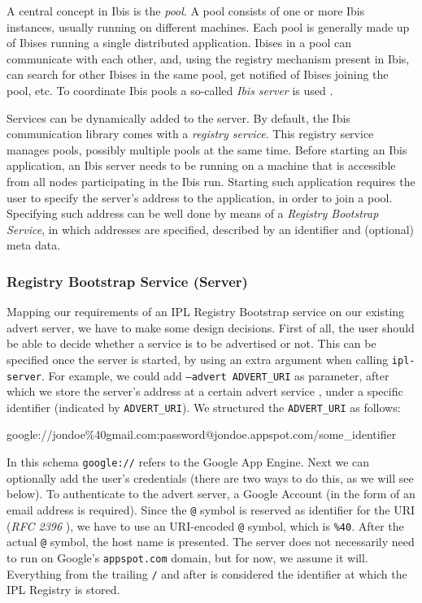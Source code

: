 A central concept in Ibis is the \emph{pool}. A pool consists of one or more Ibis
instances, usually running on different machines. Each pool is generally made up
of Ibises running a single distributed application. Ibises in a pool can
communicate with each other, and, using the registry mechanism present in Ibis,
can search for other Ibises in the same pool, get notified of Ibises joining the
pool, etc. To coordinate Ibis pools a so-called \emph{Ibis server} is used
\cite{ipl-usersguide}.

Services can be dynamically added to the server. By default, the Ibis
communication library comes with a \emph{registry service}. This registry
service manages pools, possibly multiple pools at the same time. Before starting
an Ibis application, an Ibis server needs to be running on a machine that is
accessible from all nodes participating in the Ibis run. Starting such
application requires the user to specify the server's address to the
application, in order to join a pool. Specifying such address can be well done
by means of a \emph{Registry Bootstrap Service}, in which addresses are
specified, described by an identifier and (optional) meta data.

\subsubsection{Registry Bootstrap Service (Server)}
Mapping our requirements of an IPL Registry Bootstrap service on our existing
advert server, we have to make some design decisions. First of all, the user
should be able to decide whether a service is to be advertised or not. This can
be specified once the server is started, by using an extra argument when calling
\texttt{ipl-server}. For example, we could add \texttt{--advert ADVERT\_URI} as
parameter, after which we store the server's address at a certain advert service
, under a specific identifier (indicated by \texttt{ADVERT\_URI}). We structured
the \texttt{ADVERT\_URI} as follows:

\begin{center}
\begin{code}
google://jondoe\%40gmail.com:password@jondoe.appspot.com/some_identifier
\end{code}
\end{center}

In this schema \texttt{google://} refers to the Google App Engine. Next we can
optionally add the user's credentials (there are two ways to do this, as we will
see below). To authenticate to the advert server, a Google Account (in the form
of an email address is required). Since the \texttt{@} symbol is reserved as
identifier for the URI (\emph{RFC 2396} \cite{rfc-2396}), we have to use an
URI-encoded \texttt{@} symbol, which is \texttt{\%40}. After the actual
\texttt{@} symbol, the host name is presented. The server does not necessarily
need to run on Google's \texttt{appspot.com} domain, but for now, we assume it
will. Everything from the trailing \texttt{/} and after is considered the
identifier at which the IPL Registry is stored.

